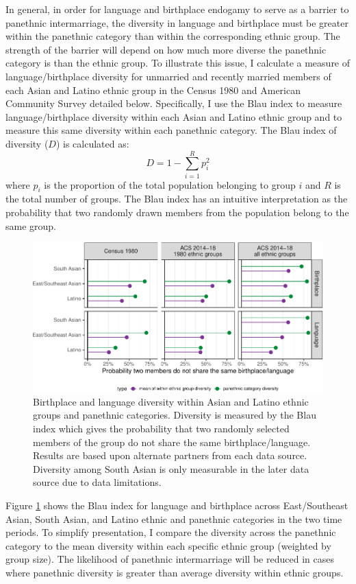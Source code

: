 \documentclass[11pt,]{article}
\begin{document}
In general, in order for language and birthplace endogamy to serve as a barrier to panethnic intermarriage, the diversity in language and birthplace must be greater within the panethnic category than within the corresponding ethnic group. The strength of the barrier will depend on how much more diverse the panethnic category is than the ethnic group. To illustrate this issue, I calculate a measure of language/birthplace diversity for unmarried and recently married members of each Asian and Latino ethnic group in the Census 1980 and American Community Survey detailed below. Specifically, I use the Blau index \citep{blau_inequality_1977} to measure language/birthplace diversity within each Asian and Latino ethnic group and to measure this same diversity within each panethnic category. The Blau index of diversity (\(D\)) is calculated as: \[D=1-\sum_{i=1}^R p_i^2\] where \(p_i\) is the proportion of the total population belonging to group \(i\) and \(R\) is the total number of groups. The Blau index has an intuitive interpretation as the probability that two randomly drawn members from the population belong to the same group.

\begin{figure}
\centering
\includegraphics{main_files/figure-latex/diversity-pan-bar-1.pdf}
\caption{\label{fig:diversity-pan-bar}Birthplace and language diversity within Asian and Latino ethnic groups and panethnic categories. Diversity is measured by the Blau index which gives the probability that two randomly selected members of the group do not share the same birthplace/language. Results are based upon alternate partners from each data source. Diversity among South Asian is only measurable in the later data source due to data limitations.}
\end{figure}

Figure \ref{fig:diversity-pan-bar} shows the Blau index for language and birthplace across East/Southeast Asian, South Asian, and Latino ethnic and panethnic categories in the two time periods. To simplify presentation, I compare the diversity across the panethnic category to the mean diversity within each specific ethnic group (weighted by group size). The likelihood of panethnic intermarriage will be reduced in cases where panethnic diversity is greater than average diversity within ethnic groups.
\end{document}

